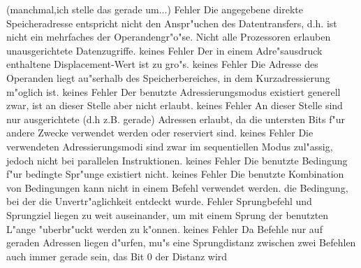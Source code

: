 \documentclass[12pt,a4paper,twoside]{report}
\begin{document}
\begin{description}
{	        (manchmal,ich stelle das gerade um...)}
               {Fehler}
               {Die angegebene direkte Speicheradresse
                entspricht nicht den Anspr"uchen des Datentransfers, d.h.
                ist nicht ein mehrfaches der Operandengr"o"se.  Nicht alle
                Prozessoren erlauben unausgerichtete Datenzugriffe.}
               {keines}
               {Fehler}
               {Der in einem Adre"sausdruck enthaltene
                Displacement-Wert ist zu gro"s.}
               {keines}
               {Fehler}
               {Die Adresse des Operanden liegt au"serhalb des
                Speicherbereiches, in dem Kurzadressierung m"oglich ist.}
               {keines}
               {Fehler}
               {Der benutzte Adressierungsmodus existiert
                generell zwar, ist an dieser Stelle aber nicht erlaubt.}
               {keines}
               {Fehler}
               {An dieser Stelle sind nur ausgerichtete
                (d.h z.B. gerade) Adressen erlaubt, da die untersten Bits f"ur
                andere Zwecke verwendet werden oder reserviert sind.}
               {keines}
               {Fehler}
               {Die verwendeten Adressierungsmodi
                sind zwar im sequentiellen Modus zul"assig, jedoch nicht
                bei parallelen Instruktionen.}
               {keines}
               {Fehler}
               {Die benutzte Bedingung f"ur bedingte Spr"unge
                existiert nicht.}
               {keines}
               {Fehler}
               {Die benutzte Kombination von Bedingungen kann nicht
                in einem Befehl verwendet werden.}
               {die Bedingung, bei der die Unvertr"aglichkeit
                entdeckt wurde.}
               {Fehler}
               {Sprungbefehl und Sprungziel liegen zu weit
                auseinander, um mit einem Sprung der benutzten L"ange
                "uberbr"uckt werden zu k"onnen.}
               {keines}
               {Fehler}
               {Da Befehle nur auf geraden Adressen liegen
                d"urfen, mu"s eine Sprungdistanz zwischen zwei Befehlen
                auch immer gerade sein, das Bit 0 der Distanz wird
}
\end{description}
\end{document}
